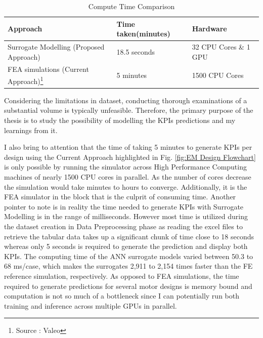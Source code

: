 \documentclass{report} %
\begin{document}
\begin{minipage}[t]{\textwidth}
    \begin{table}[H]
        \centering
        \begin{tabular}{|p{}|p{}|p{}|}
        \hline {\bf Approach} & {\bf Time taken(minutes)} & {\bf Hardware}\\
        \hline 
        Surrogate Modelling (Proposed Approach) & 18.5 seconds & 32 CPU Cores \& 1 GPU\\
        \ac{FEA} simulations (Current Approach)\footnote{Source : Valeo} & 5 minutes & 1500 CPU Cores\\
        \hline
        \end{tabular}
        \caption{Compute Time Comparison}
        \label{tab:Compute Time Comparisions}
    \end{table}
\end{minipage}

\vspace{1em} %

Considering the limitations in dataset, conducting thorough examinations of a substantial volume is typically unfeasible. 
Therefore, the primary purpose of the thesis is to study the possibility of modelling the \ac{KPI}s predictions and my learnings from it.

I also bring to attention that the time of taking 5 minutes to generate \ac{KPI}s per design using the Current Approach highlighted in Fig. 
\ref{fig:EM Design Flowchart} is only possible by running the simulator across High Performance Computing machines of nearly 1500 CPU cores in parallel. 
As the number of cores decrease the simulation would take minutes to hours to converge. Additionally, it is the \ac{FEA} simulator in the block that is the culprit of 
consuming time. Another pointer to note is in reality the time needed to generate \ac{KPI}s with Surrogate Modelling is in the range of milliseconds. 
However most time is utilized during the dataset creation in Data Preprocessing phase as reading the excel files to retrieve the tabular data takes up a 
significant chunk of time close to 18 seconds whereas only 5 seconds is required to generate the prediction and display both \ac{KPI}s.
The computing time of the \ac{ANN} surrogate models varied between 50.3 to 68 ms/case, which makes the surrogates 2,911 to 2,154 times faster than the FE reference simulation, 
respectively. As opposed to \ac{FEA} simulations, the time required to generate predictions for several motor designs is memory bound 
and computation is not so much of a bottleneck since I can potentially run both training and inference across multiple GPUs in parallel.
\end{document}
